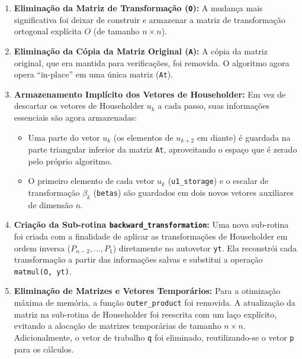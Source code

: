 \documentclass[12pt, a4paper]{article} %
\begin{document}
        \begin{enumerate}
            \item \textbf{Elimina\c{c}\~ao da Matriz de Transforma\c{c}\~ao (\texttt{O}):} A mudan\c{c}a mais significativa foi deixar de construir e armazenar a matriz de transforma\c{c}\~ao ortogonal expl\'icita $O$ (de tamanho $n \times n$).

            \item \textbf{Elimina\c{c}\~ao da C\'opia da Matriz Original (\texttt{A}):} A c\'opia da matriz original, que era mantida para verifica\c{c}\~oes, foi removida. O algoritmo agora opera ``in-place'' em uma \'unica matriz (\texttt{At}).

            \item \textbf{Armazenamento Impl\'icito dos Vetores de Householder:} Em vez de descartar os vetores de Householder $u_k$ a cada passo, suas informa\c{c}\~oes essenciais s\~ao agora armazenadas:
            \begin{itemize}
                \item Uma parte do vetor $u_k$ (os elementos de $u_{k+2}$ em diante) \'e guardada na parte triangular inferior da matriz \texttt{At}, aproveitando o espa\c{c}o que \'e zerado pelo pr\'oprio algoritmo.
                \item O primeiro elemento de cada vetor $u_k$ (\texttt{u1\_storage}) e o escalar de transforma\c{c}\~ao $\beta_k$ (\texttt{betas}) s\~ao guardados em dois novos vetores auxiliares de dimens\~ao $n$.
            \end{itemize}

            \item \textbf{Cria\c{c}\~ao da Sub-rotina \texttt{backward\_transformation}:} Uma nova sub-rotina foi criada com a finalidade de aplicar as transforma\c{c}\~oes de Householder em ordem inversa ($P_{n-2}, \dots, P_1$) diretamente no autovetor \texttt{yt}. Ela reconstr\'oi cada transforma\c{c}\~ao a partir das informa\c{c}\~oes salvas e substitui a opera\c{c}\~ao \texttt{matmul(O, yt)}.
            
            \item \textbf{Elimina\c{c}\~ao de Matrizes e Vetores Tempor\'arios:} Para a otimiza\c{c}\~ao m\'axima de mem\'oria, a fun\c{c}\~ao \texttt{outer\_product} foi removida. A atualiza\c{c}\~ao da matriz na sub-rotina de Householder foi reescrita com um la\c{c}o expl\'icito, evitando a aloca\c{c}\~ao de matrizes tempor\'arias de tamanho $n \times n$. Adicionalmente, o vetor de trabalho \texttt{q} foi eliminado, reutilizando-se o vetor \texttt{p} para os c\'alculos.

        \end{enumerate}
\end{document}

